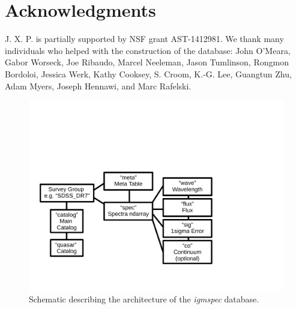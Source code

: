 \documentclass[12pt]{elsarticle}
\begin{document}
\section{Acknowledgments}

J. X. P. is partially supported by NSF grant AST-1412981.
We thank many individuals who helped with the construction
of the database:
John O'Meara, Gabor Worseck, Joe Ribaudo, Marcel Neeleman,
Jason Tumlinson, Rongmon Bordoloi, Jessica Werk,
Kathy Cooksey, S. Croom, K.-G. Lee, Guangtun Zhu,
Adam Myers, Joseph Hennawi,  and Marc Rafelski.






%
%


\begin{figure}
\includegraphics[width=6in]{architecture_v02.pdf}
\caption{Schematic describing the architecture of 
the {\it igmspec} database.
}
\label{fig:arch}
\end{figure}
\end{document}
